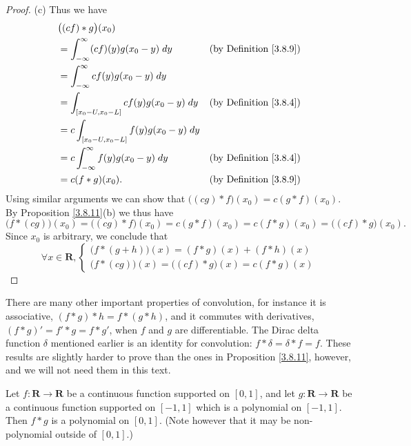 \begin{proof}{(c)}
    Thus we have
    \begin{align*}
         & \big((cf) * g\big)(x_0)                                                                  \\
         & = \int_{-\infty}^\infty (cf)(y) g(x_0 - y) \; dy    & \text{(by Definition \ref{3.8.9})} \\
         & = \int_{-\infty}^\infty c f(y) g(x_0 - y) \; dy                                          \\
         & = \int_{[x_0 - U, x_0 - L]} c f(y) g(x_0 - y) \; dy & \text{(by Definition \ref{3.8.4})} \\
         & = c \int_{[x_0 - U, x_0 - L]} f(y) g(x_0 - y) \; dy                                      \\
         & = c \int_{-\infty}^\infty f(y) g(x_0 - y) \; dy     & \text{(by Definition \ref{3.8.4})} \\
         & = c (f * g)(x_0).                                   & \text{(by Definition \ref{3.8.9})}
    \end{align*}
    Using similar arguments we can show that \(\big((cg) * f\big)(x_0) = c (g * f)(x_0)\).
    By Proposition \ref{3.8.11}(b) we thus have
    \[
        \big(f * (cg)\big)(x_0) = \big((cg) * f\big)(x_0) = c(g * f)(x_0) = c(f * g)(x_0) = \big((cf) * g\big)(x_0).
    \]
    Since \(x_0\) is arbitrary, we conclude that
    \[
        \forall x \in \mathbf{R}, \begin{cases}
            \big(f * (g + h)\big)(x) = (f * g)(x) + (f * h)(x) \\
            \big(f * (cg)\big)(x) = \big((cf) * g\big)(x) = c(f * g)(x)
        \end{cases}
    \]
\end{proof}

\begin{remark}\label{3.8.12}
    There are many other important properties of convolution, for instance it is associative, \((f * g) * h = f * (g * h)\), and it commutes with derivatives, \((f * g)' = f' * g = f * g'\), when \(f\) and \(g\) are differentiable.
    The Dirac delta function \(\delta\) mentioned earlier is an identity for convolution:
    \(f * \delta = \delta * f = f\).
    These results are slightly harder to prove than the ones in Proposition \ref{3.8.11}, however, and we will not need them in this text.
\end{remark}

\begin{lemma}\label{3.8.13}
    Let \(f : \mathbf{R} \to \mathbf{R}\) be a continuous function supported on \([0, 1]\), and let \(g : \mathbf{R} \to \mathbf{R}\) be a continuous function supported on \([-1, 1]\) which is a polynomial on \([-1, 1]\).
    Then \(f * g\) is a polynomial on \([0, 1]\).
    (Note however that it may be non-polynomial outside of \([0, 1].\))
\end{lemma}

